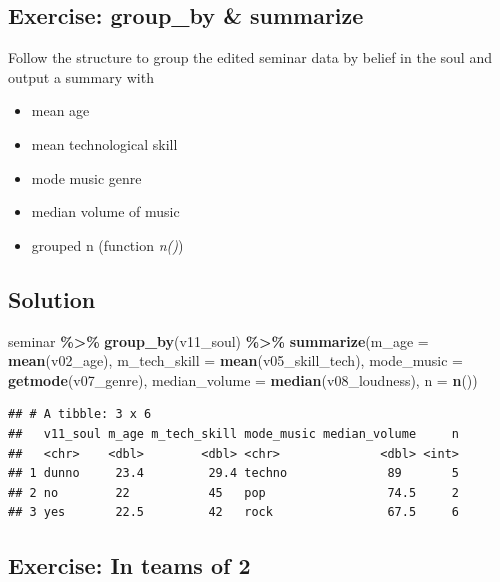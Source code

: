 \documentclass[
]{book}
\newenvironment{Shaded}{\begin{snugshade}}{\end{snugshade}}
\newcommand{\AttributeTok}[1]{\textcolor[rgb]{0.13,0.29,0.53}{#1}}
\newcommand{\FunctionTok}[1]{\textcolor[rgb]{0.13,0.29,0.53}{\textbf{#1}}}
\newcommand{\NormalTok}[1]{#1}
\newcommand{\SpecialCharTok}[1]{\textcolor[rgb]{0.81,0.36,0.00}{\textbf{#1}}}
\providecommand{\tightlist}{%
  \setlength{\itemsep}{0pt}\setlength{\parskip}{0pt}}
\begin{document}
\subsection{Exercise: group\_by \& summarize}\label{exercise-group_by-summarize-1}

Follow the structure to group the edited seminar data by belief in the soul and output a summary with

\begin{itemize}
\tightlist
\item
  mean age
\item
  mean technological skill
\item
  mode music genre
\item
  median volume of music
\item
  grouped n (function \emph{n()})
\end{itemize}

\subsection{Solution}\label{solution-5}

\begin{Shaded}
\begin{Highlighting}[]
\NormalTok{seminar }\SpecialCharTok{\%\textgreater{}\%} 
  \FunctionTok{group\_by}\NormalTok{(v11\_soul) }\SpecialCharTok{\%\textgreater{}\%} 
  \FunctionTok{summarize}\NormalTok{(}\AttributeTok{m\_age =} \FunctionTok{mean}\NormalTok{(v02\_age),}
            \AttributeTok{m\_tech\_skill =} \FunctionTok{mean}\NormalTok{(v05\_skill\_tech),}
            \AttributeTok{mode\_music =} \FunctionTok{getmode}\NormalTok{(v07\_genre),}
            \AttributeTok{median\_volume =} \FunctionTok{median}\NormalTok{(v08\_loudness),}
            \AttributeTok{n =} \FunctionTok{n}\NormalTok{())}
\end{Highlighting}
\end{Shaded}

\begin{verbatim}
## # A tibble: 3 x 6
##   v11_soul m_age m_tech_skill mode_music median_volume     n
##   <chr>    <dbl>        <dbl> <chr>              <dbl> <int>
## 1 dunno     23.4         29.4 techno              89       5
## 2 no        22           45   pop                 74.5     2
## 3 yes       22.5         42   rock                67.5     6
\end{verbatim}

\subsection{Exercise: In teams of 2}\label{exercise-in-teams-of-2}
\end{document}
